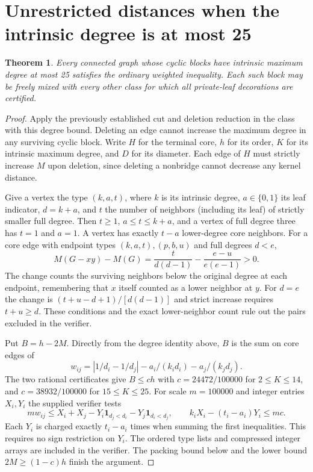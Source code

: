 \documentclass[11pt,a4paper]{article}
\newtheorem{theorem}{Theorem}[section]
\begin{document}
\section{Unrestricted distances when the intrinsic degree is at most 25}\label{p13-sec:degree}
\begin{theorem}
Every connected graph whose cyclic blocks have intrinsic maximum degree at most 25 satisfies the ordinary weighted inequality. Each such block may be freely mixed with every other class for which all private-leaf decorations are certified.
\end{theorem}
\begin{proof}
Apply the previously established cut and deletion reduction in the class with this degree bound. Deleting an edge cannot increase the maximum degree in any surviving cyclic block. Write $H$ for the terminal core, $h$ for its order, $K$ for its intrinsic maximum degree, and $D$ for its diameter. Each edge of $H$ must strictly increase $M$ upon deletion, since deleting a nonbridge cannot decrease any kernel distance.

Give a vertex the type $(k,a,t)$, where $k$ is its intrinsic degree, $a\in\{0,1\}$ its leaf indicator, $d=k+a$, and $t$ the number of neighbors (including its leaf) of strictly smaller full degree. Then $t\ge1$, $a\le t\le k+a$, and a vertex of full degree three has $t=1$ and $a=1$. A vertex has exactly $t-a$ lower-degree core neighbors. For a core edge with endpoint types $(k,a,t),(p,b,u)$ and full degrees $d<e$,
\[
  M(G-xy)-M(G)=\frac{t}{d(d-1)}-\frac{e-u}{e(e-1)}>0.
\]
The change counts the surviving neighbors below the original degree at each endpoint, remembering that $x$ itself counted as a lower neighbor at $y$. For $d=e$ the change is $(t+u-d+1)/[d(d-1)]$ and strict increase requires $t+u\ge d$. These conditions and the exact lower-neighbor count rule out the pairs excluded in the verifier.

Put $B=h-2M$. Directly from the degree identity above, $B$ is the sum on core edges of
\[
 w_{ij}=|1/d_i-1/d_j|-a_i/(k_i d_i)-a_j/(k_j d_j).
\]
The two rational certificates give $B\le ch$ with $c=24472/100000$ for $2\le K\le14$, and $c=38932/100000$ for $15\le K\le25$. For scale $m=100000$ and integer entries $X_i,Y_i$ the supplied verifier tests
\[
 mw_{ij}\le X_i+X_j-Y_i\mathbf1_{d_j<d_i}-Y_j\mathbf1_{d_i<d_j},
 \qquad k_iX_i-(t_i-a_i)Y_i\le mc .
\]
Each $Y_i$ is charged exactly $t_i-a_i$ times when summing the first inequalities. This requires no sign restriction on $Y_i$. The ordered type lists and compressed integer arrays are included in the verifier. The packing bound below and the lower bound $2M\ge(1-c)h$ finish the argument.


\end{proof}
\end{document}
